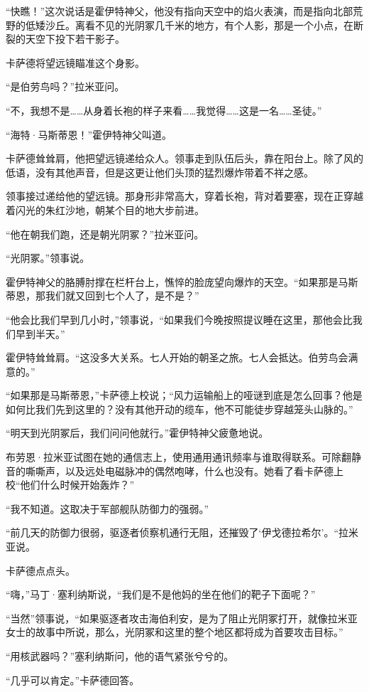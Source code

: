 \documentclass[AutoFakeBold=true]{book}
\begin{document}
``快瞧！''这次说话是霍伊特神父，他没有指向天空中的焰火表演，而是指向北部荒野的低矮沙丘。离看不见的光阴冢几千米的地方，有个人影，那是一个小点，在断裂的天空下投下若干影子。

卡萨德将望远镜瞄准这个身影。

``是伯劳鸟吗？''拉米亚问。

``不，我想不是……从身着长袍的样子来看……我觉得……这是一名……圣徒。''

``海特·马斯蒂恩！''霍伊特神父叫道。

卡萨德耸耸肩，他把望远镜递给众人。领事走到队伍后头，靠在阳台上。除了风的低语，没有其他声音，但是这更让他们头顶的猛烈爆炸带着不祥之感。

领事接过递给他的望远镜。那身形非常高大，穿着长袍，背对着要塞，现在正穿越着闪光的朱红沙地，朝某个目的地大步前进。

``他在朝我们跑，还是朝光阴冢？''拉米亚问。

``光阴冢。''领事说。

霍伊特神父的胳膊肘撑在栏杆台上，憔悴的脸庞望向爆炸的天空。``如果那是马斯蒂恩，那我们就又回到七个人了，是不是？''

``他会比我们早到几小时，''领事说，``如果我们今晚按照提议睡在这里，那他会比我们早到半天。''

霍伊特耸耸肩。``这没多大关系。七人开始的朝圣之旅。七人会抵达。伯劳鸟会满意的。''

``如果那是马斯蒂恩，''卡萨德上校说；``风力运输船上的哑谜到底是怎么回事？他是如何比我们先到这里的？没有其他开动的缆车，他不可能徒步穿越笼头山脉的。''

``明天到光阴冢后，我们问问他就行。''霍伊特神父疲惫地说。

布劳恩·拉米亚试图在她的通信志上，使用通用通讯频率与谁取得联系。可除翻静音的嘶嘶声，以及远处电磁脉冲的偶然咆哮，什么也没有。她看了看卡萨德上校``他们什么时候开始轰炸？''

``我不知道。这取决于军部舰队防御力的强弱。''

``前几天的防御力很弱，驱逐者侦察机通行无阻，还摧毁了`伊戈德拉希尔'。``拉米亚说。

卡萨德点点头。

``嗨，''马丁·塞利纳斯说，``我们是不是他妈的坐在他们的靶子下面呢？''

``当然''领事说，``如果驱逐者攻击海伯利安，是为了阻止光阴冢打开，就像拉米亚女士的故事中所说，那么，光阴冢和这里的整个地区都将成为首要攻击目标。''

``用核武器吗？''塞利纳斯问，他的语气紧张兮兮的。

``几乎可以肯定。''卡萨德回答。
\end{document}
